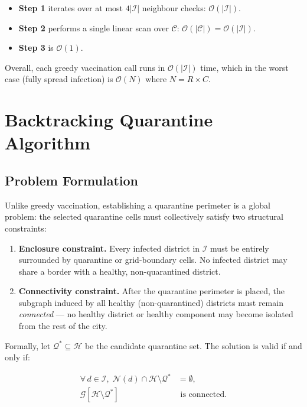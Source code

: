 \documentclass[conference]{IEEEtran}
\begin{document}
\begin{itemize}
  \item \textbf{Step 1} iterates over at most $4|\mathcal{I}|$ neighbour checks:
        $\mathcal{O}(|\mathcal{I}|)$.
  \item \textbf{Step 2} performs a single linear scan over $\mathcal{C}$:
        $\mathcal{O}(|\mathcal{C}|) = \mathcal{O}(|\mathcal{I}|)$.
  \item \textbf{Step 3} is $\mathcal{O}(1)$.
\end{itemize}

Overall, each greedy vaccination call runs in $\mathcal{O}(|\mathcal{I}|)$ time,
which in the worst case (fully spread infection) is $\mathcal{O}(N)$ where
$N = R \times C$.

\section{Backtracking Quarantine Algorithm}
\label{sec:backtracking}

\subsection{Problem Formulation}

Unlike greedy vaccination, establishing a quarantine perimeter is a global problem:
the selected quarantine cells must collectively satisfy two structural constraints:

\begin{enumerate}
  \item \textbf{Enclosure constraint.} Every infected district in $\mathcal{I}$ must
        be entirely surrounded by quarantine or grid-boundary cells. No infected
        district may share a border with a healthy, non-quarantined district.
  \item \textbf{Connectivity constraint.} After the quarantine perimeter is placed,
        the subgraph induced by all healthy (non-quarantined) districts must remain
        \emph{connected} — no healthy district or healthy component may become
        isolated from the rest of the city.
\end{enumerate}

Formally, let $\mathcal{Q}^* \subseteq \mathcal{H}$ be the candidate quarantine
set. The solution is valid if and only if:

\begin{align}
  \forall\, d \in \mathcal{I},\; \mathcal{N}(d) \cap \mathcal{H} \setminus \mathcal{Q}^* &= \emptyset,
    \label{eq:enclosure}\\
  \mathcal{G}[\mathcal{H} \setminus \mathcal{Q}^*] &\text{ is connected.}
    \label{eq:connectivity}
\end{align}
\end{document}
